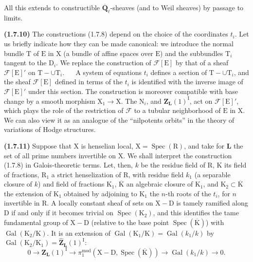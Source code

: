 \documentclass[11pt,leqno]{article}
\newcommand{\Page}[1]{\ifvmode\noindent\else\unskip\ \fi{\footnotesize\textcolor{gray}{[p.\,#1]}}\ \ignorespaces}
\begin{document}
All this extends to constructible \(\overline{\mathbf{Q}}_\ell\)-sheaves (and to Weil sheaves) by passage to limits.

\textbf{(1.7.10)} The constructions (1.7.8) depend on the choice of the coordinates \(t_i\). Let us briefly indicate how they can be made canonical: we introduce the normal bundle \(\mathrm{T}\) of \(\mathrm{E}\) in \(\mathrm{X}\) (a bundle of affine spaces over \(\mathrm{E}\)) and the subbundles \(\mathrm{T}_i\) tangent to the \(\mathrm{D}_i\). We replace the construction of \(\mathscr{F}[\mathrm{E}]\) by that of a sheaf \(\mathscr{F}[\mathrm{E}]'\) on \(\mathrm{T}-\cup\mathrm{T}_i\).
\Page{174}
A system of equations \(t_i\) defines a section of \(\mathrm{T}-\cup\mathrm{T}_i\), and the sheaf \(\mathscr{F}[\mathrm{E}]\) defined in terms of the \(t_i\) is identified with the inverse image of \(\mathscr{F}[\mathrm{E}]'\) under this section. The construction is moreover compatible with base change by a smooth morphism \(\mathrm{X}_1\to\mathrm{X}\). The \(\mathrm{N}_i\), and \(\mathbf{Z}_{\mathbf{L}}(1)^{\mathrm{I}}\), act on \(\mathscr{F}[\mathrm{E}]'\), which plays the role of the restriction of \(\mathscr{F}\) to a tubular neighborhood of \(\mathrm{E}\) in \(\mathrm{X}\). We can also view it as an analogue of the “nilpotents orbits” in the theory of variations of Hodge structures.

\textbf{(1.7.11)} Suppose that \(\mathrm{X}\) is henselian local, \(\mathrm{X}=\operatorname{Spec}(\mathrm{R})\), and take for \(\mathbf{L}\) the set of all prime numbers invertible on \(\mathrm{X}\). We shall interpret the construction (1.7.8) in Galois-theoretic terms. Let, then, \(k\) be the residue field of \(\mathrm{R}\), \(\mathrm{K}\) its field of fractions, \(\mathrm{R}_1\) a strict henselization of \(\mathrm{R}\), with residue field \(k_1\) (a separable closure of \(k\)) and field of fractions \(\mathrm{K}_1\), \(\overline{\mathrm{K}}\) an algebraic closure of \(\mathrm{K}_1\), and \(\mathrm{K}_2\subset\overline{\mathrm{K}}\) the extension of \(\mathrm{K}_1\) obtained by adjoining to \(\mathrm{K}_1\) the \(n\)-th roots of the \(t_i\), for \(n\) invertible in \(\mathrm{R}\). A locally constant sheaf of sets on \(\mathrm{X}-\mathrm{D}\) is tamely ramified along \(\mathrm{D}\) if and only if it becomes trivial on \(\operatorname{Spec}(\mathrm{K}_2)\), and this identifies the tame fundamental group of \(\mathrm{X}-\mathrm{D}\) (relative to the base point \(\operatorname{Spec}(\overline{\mathrm{K}})\)) with \(\operatorname{Gal}(\mathrm{K}_2/\mathrm{K})\). It is an extension of \(\operatorname{Gal}(\mathrm{K}_1/\mathrm{K})=\operatorname{Gal}(k_1/k)\) by \(\operatorname{Gal}(\mathrm{K}_2/\mathrm{K}_1)=\widehat{\mathbf{Z}}_{\mathbf{L}}(1)^{\mathrm{I}}\):
\[
0\to\mathbf{Z}_{\mathbf{L}}(1)^{\mathrm{I}}
\to\pi_1^{\mathrm{mod}}(\mathrm{X}-\mathrm{D},\operatorname{Spec}(\overline{\mathrm{K}}))
\to\operatorname{Gal}(k_1/k)\to0.
\]
\end{document}
